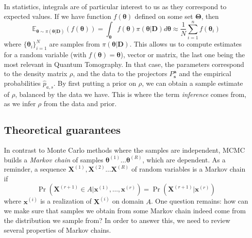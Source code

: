 \documentclass[12pt]{memoir}
\newcommand{\mb}{\mathbf}
\newcommand{\ti}{\textit}
\newcommand{\btheta}{\boldsymbol{\theta}}
\begin{document}
In statistics, integrals are of particular interest to us as they correspond to expected values. If we have function $f(\boldsymbol{\theta})$ defined on some set $\boldsymbol{\Theta}$, then
\begin{equation}
    \mathbb E_{\boldsymbol \theta \sim \pi(\btheta|\mb{D})}\left(f(\boldsymbol{\theta})\right) = \int_{\boldsymbol{\theta}} f(\boldsymbol{\theta})\pi(\btheta|\mb{D}) d\boldsymbol{\btheta} \approx \frac{1}{N} \sum_{i=1}^{n} f(\boldsymbol{\theta}_i)
\end{equation}
where $\{\boldsymbol{\theta}_i\}^N_{i=1}$ are samples from $\pi(\btheta|\mb{D})$. This allows us to compute estimates for a random variable (with $f(\btheta) = \btheta$), vector or matrix, the last one being the most relevant in Quantum Tomography. In that case, the parameters correspond to the density matrix $\rho$, and the data to the projectors $P^{\mb a}_{\mb s}$ and the empirical probabilities $\hat p_{a,s}$. By first putting a prior on $\rho$, we can obtain a sample estimate of $\rho$, balanced by the data we have. This is where the term \ti{inference} comes from, as we infer $\rho$ from the data and prior.

\subsection{Theoretical guarantees}\label{section:background:mcmc:theory}
In contrast to Monte Carlo methods where the samples are independent, MCMC builds a \ti{Markov chain} of samples $\btheta^{(1)} \dots \btheta^{(R)}$, which are dependent. As a reminder, a sequence $\mb X^{(1)}, \mb X^{(2)} \dots \mb X^{(R)}$ of random variables is a Markov chain if
\begin{equation}
    \Pr(\mb X^{(r+1)} \in A|\mb x^{(1)}, \dots, \mb x^{(r)}) = \Pr(\mb X^{(r+1)}|\mb x^{(r)})
\end{equation}
where $\mb x^{(i)}$ is a realization of $\mb X^{(i)}$ on domain $A$. One question remains: how can we make sure that samples we obtain from some Markov chain indeed come from the distribution we sample from? In order to answer this, we need to review several properties of Markov chains.\medbreak
\end{document}
